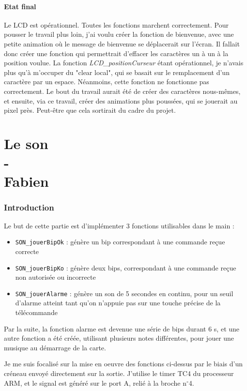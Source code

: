 \documentclass[a4paper]{report}
\begin{document}
			\subsection{Etat final}
				Le LCD est opérationnel. Toutes les fonctions marchent correctement. Pour pousser le travail plus loin, j'ai voulu créer la fonction de bienvenue, avec une petite animation où le message de bienvenue se déplacerait sur l'écran. Il fallait donc créer une fonction qui permettrait d'effacer les caractères un à un à la position voulue. La fonction \emph{LCD\_positionCurseur} étant opérationnel, je n'avais plus qu'à m'occuper du "clear local", qui se basait sur le remplacement d'un caractère par un espace. Néanmoins, cette fonction ne fonctionne pas correctement. Le bout du travail aurait été de créer des caractères nous-mêmes, et ensuite, via ce travail, créer des animations plus poussées, qui se jouerait au pixel près. Peut-être que cela sortirait du cadre du projet.


\part{Le son\\-\\Fabien {}}
\section{Introduction}
Le but de cette partie est d'implémenter 3 fonctions utilisables dans le main :

\begin{itemize}
\item \texttt{SON\_jouerBipOk} : génère un bip correspondant à une commande reçue correcte
\item \texttt{SON\_jouerBipKo} : génère deux bips, correspondant à une commande reçue non autorisée ou incorrecte
\item \texttt{SON\_jouerAlarme} : génère un son de 5 secondes en continu, pour un seuil d’alarme atteint tant qu’on n'appuie pas sur une touche précise de la télécommande
\end{itemize}

Par la suite, la fonction alarme est devenue une série de bips durant 6 s, et une autre fonction a été créée, utilisant plusieurs notes différentes, pour jouer une musique au démarrage de la carte.

Je me suis focalisé sur la mise en oeuvre des fonctions ci-dessus par le biais d'un créneau envoyé directement sur la sortie.
J'utilise le timer TC4 du processeur ARM, et le signal est généré sur le port A, relié à la broche n$^\circ$4.
\end{document}
